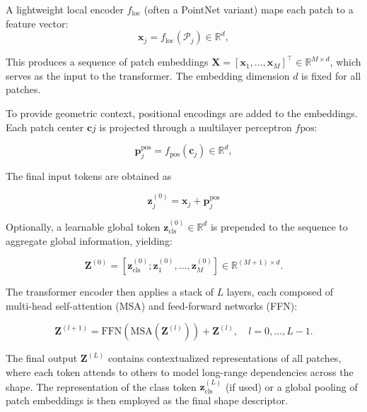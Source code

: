 A lightweight local encoder $f_{\text{loc}}$ (often a PointNet variant) maps each patch to a feature vector:
\begin{equation}
    \mathbf{x}_j = f_{\text{loc}}(\mathcal{P}_j) \in \mathbb{R}^d,
\end{equation}

This produces a sequence of patch embeddings $\mathbf{X} = [\mathbf{x}_1, \dots, \mathbf{x}_M]^{\top} \in \mathbb{R}^{M \times d}$, which serves as the input to the transformer. The embedding dimension $d$ is fixed for all patches.

To provide geometric context, positional encodings are added to the embeddings. Each patch center $\mathbf{c}j$ is projected through a multilayer perceptron $f{\text{pos}}$:

\begin{equation}
  \mathbf{p}_j^\text{pos} = f_{\text{pos}}(\mathbf{c}_j) \in \mathbb{R}^d,
\end{equation}

The final input tokens are obtained as

\begin{equation}
  \mathbf{z}_j^{(0)} = \mathbf{x}_j + \mathbf{p}_j^\text{pos}
\end{equation}

Optionally, a learnable global token $\mathbf{z}_{\text{cls}}^{(0)} \in \mathbb{R}^{d}$ is prepended to the sequence to aggregate global information, yielding:

\begin{equation}
  \mathbf{Z}^{(0)} = [\mathbf{z}_{\text{cls}}^{(0)}; \mathbf{z}_1^{(0)}, \dots, \mathbf{z}_M^{(0)}] \in \mathbb{R}^{(M+1) \times d}.
\end{equation}

The transformer encoder then applies a stack of $L$ layers, each composed of multi-head self-attention (MSA) and feed-forward networks (FFN):

\begin{equation}
  \mathbf{Z}^{(l+1)} = \text{FFN}(\text{MSA}(\mathbf{Z}^{(l)})) + \mathbf{Z}^{(l)}, \quad l=0,\dots,L-1.
\end{equation}

The final output $\mathbf{Z}^{(L)}$ contains contextualized representations of all patches, where each token attends to others to model long-range dependencies across the shape. The representation of the class token $\mathbf{z}_{\text{cls}}^{(L)}$ (if used) or a global pooling of patch embeddings is then employed as the final shape descriptor.

